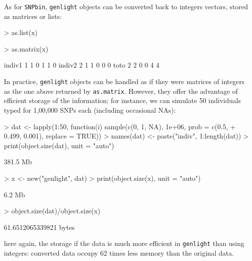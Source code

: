 \documentclass{article}
\begin{document}
As for \texttt{SNPbin}, \texttt{genlight} objects can be converted back to integers vectors, stored
as matrices or lists:
\begin{Schunk}
\begin{Sinput}
> as.list(x)
\end{Sinput}
\begin{Sinput}
> as.matrix(x)
\end{Sinput}
\begin{Soutput}
       [,1] [,2] [,3] [,4] [,5] [,6]
indiv1    1    1    0    1    1    0
indiv2    2    1    1    0    0    0
toto      2    2    0    0    4    4
\end{Soutput}
\end{Schunk}

\noindent In practice, \texttt{genlight} objects can be handled as if they were matrices of integers
as the one above returned by \texttt{as.matrix}.
However, they offer the advantage of efficient storage of the information; for instance, we can
simulate 50 individuals typed for 1,00,000 SNPs each (including occasional NAs):
\begin{Schunk}
\begin{Sinput}
> dat <- lapply(1:50, function(i) sample(c(0, 1, NA), 1e+06, prob = c(0.5, 
+     0.499, 0.001), replace = TRUE))
> names(dat) <- paste("indiv", 1:length(dat))
> print(object.size(dat), unit = "auto")
\end{Sinput}
\begin{Soutput}
381.5 Mb
\end{Soutput}
\begin{Sinput}
> x <- new("genlight", dat)
> print(object.size(x), unit = "auto")
\end{Sinput}
\begin{Soutput}
6.2 Mb
\end{Soutput}
\begin{Sinput}
> object.size(dat)/object.size(x)
\end{Sinput}
\begin{Soutput}
61.6512065339821 bytes
\end{Soutput}
\end{Schunk}
here again, the storage if the data is much more efficient in \texttt{genlight} than using integers: converted data occupy
62 times less memory than the original data.
\\
\end{document}
